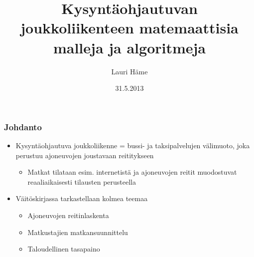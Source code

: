 \documentclass{beamer}
\title[Aalto-yliopiston perustieteiden korkeakoulu]{Kysyntäohjautuvan joukkoliikenteen matemaattisia malleja ja algoritmeja}
\author[L. Häme]{Lauri Häme}                 %
\institute[Aalto-yliopiston perustieteiden korkeakoulu]{Aalto-yliopiston perustieteiden korkeakoulu}      %
\date{31.5.2013}      %
\begin{document}
\begin{frame}
  \titlepage
\end{frame}


\begin{frame}
  \frametitle{Johdanto}   %
  \begin{itemize}
    \item 
Kysyntäohjautuva joukkoliikenne = bussi- ja taksipalvelujen välimuoto, joka perustuu ajoneuvojen joustavaan reititykseen
\begin{itemize}
 \item 
 Matkat tilataan esim. internetistä ja ajoneuvojen reitit muodostuvat reaaliaikaisesti tilausten perusteella
 \end{itemize}
 
  \item 
Väitöskirjassa tarkastellaan kolmea teemaa
 \begin{itemize}
\item
Ajoneuvojen reitinlaskenta
\item
Matkustajien matkansuunnittelu
\item
Taloudellinen tasapaino
\end{itemize}
 \end{itemize}

 
\end{frame}
\end{document}
